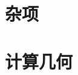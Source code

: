 \documentclass[a4paper,11pt]{article}
\begin{document}
\newpage
\section{杂项}


















\newpage
\section{计算几何}







\end{document}
